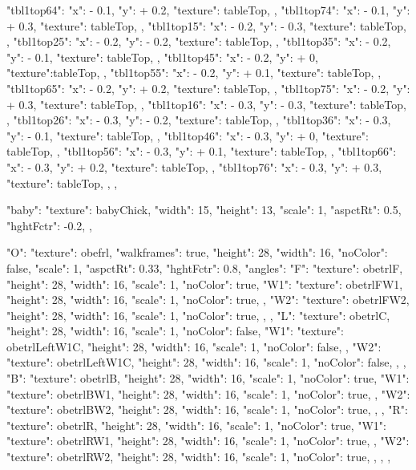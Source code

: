 {{{      "tbl1top64":{ "x": - 0.1, "y": + 0.2, "texture": tableTop, },
      "tbl1top74":{ "x": - 0.1, "y": + 0.3, "texture": tableTop, },
      "tbl1top15":{ "x": - 0.2, "y": - 0.3, "texture": tableTop, },
      "tbl1top25":{ "x": - 0.2, "y": - 0.2, "texture": tableTop, },
      "tbl1top35":{ "x": - 0.2, "y": - 0.1, "texture": tableTop, },
      "tbl1top45":{ "x": - 0.2, "y": + 0, "texture":tableTop, },
      "tbl1top55":{ "x": - 0.2, "y": + 0.1, "texture": tableTop, },
      "tbl1top65":{ "x": - 0.2, "y": + 0.2, "texture": tableTop, },
      "tbl1top75":{ "x": - 0.2, "y": + 0.3, "texture": tableTop, },
      "tbl1top16":{ "x": - 0.3, "y": - 0.3, "texture": tableTop, },
      "tbl1top26":{ "x": - 0.3, "y": - 0.2, "texture": tableTop, },
      "tbl1top36":{ "x": - 0.3, "y": - 0.1, "texture": tableTop, },
      "tbl1top46":{ "x": - 0.3, "y": + 0, "texture": tableTop, },
      "tbl1top56":{ "x": - 0.3, "y": + 0.1, "texture": tableTop, },
      "tbl1top66":{ "x": - 0.3, "y": + 0.2, "texture": tableTop, },
      "tbl1top76":{ "x": - 0.3, "y": + 0.3, "texture": tableTop, },
    }
  },


  "baby": {
    "texture": babyChick,
    "width": 15,
    "height": 13,
    "scale": 1,
    "aspctRt": 0.5,
    "hghtFctr": -0.2,
  },

  "O": {
    "texture": obefrl,
    "walkframes": true,
    "height": 28,
    "width": 16,
    "noColor": false,
    "scale": 1,
    "aspctRt": 0.33,
    "hghtFctr": 0.8,
    "angles":{
      "F": {
        "texture": obetrlF,
        "height": 28,
        "width": 16,
        "scale": 1,
        "noColor": true,
        "W1": {
          "texture": obetrlFW1,
          "height": 28,
          "width": 16,
          "scale": 1,
          "noColor": true,
        },
        "W2": {
          "texture": obetrlFW2,
          "height": 28,
          "width": 16,
          "scale": 1,
          "noColor": true,
        },
      },
      "L": {
        "texture": obetrlC,
        "height": 28,
        "width": 16,
        "scale": 1,
        "noColor": false,
        "W1": {
          "texture": obetrlLeftW1C,
          "height": 28,
          "width": 16,
          "scale": 1,
          "noColor": false,
        },
        "W2": {
          "texture": obetrlLeftW1C,
          "height": 28,
          "width": 16,
          "scale": 1,
          "noColor": false,
        },
      },
      "B": {
        "texture": obetrlB,
        "height": 28,
        "width": 16,
        "scale": 1,
        "noColor": true,
        "W1": {
          "texture": obetrlBW1,
          "height": 28,
          "width": 16,
          "scale": 1,
          "noColor": true,
        },
        "W2": {
          "texture": obetrlBW2,
          "height": 28,
          "width": 16,
          "scale": 1,
          "noColor": true,
        },
      },
      "R": {
        "texture": obetrlR,
        "height": 28,
        "width": 16,
        "scale": 1,
        "noColor": true,
        "W1": {
          "texture": obetrlRW1,
          "height": 28,
          "width": 16,
          "scale": 1,
          "noColor": true,
        },
        "W2": {
          "texture": obetrlRW2,
          "height": 28,
          "width": 16,
          "scale": 1,
          "noColor": true,
        },
      },
    }
  },

}
